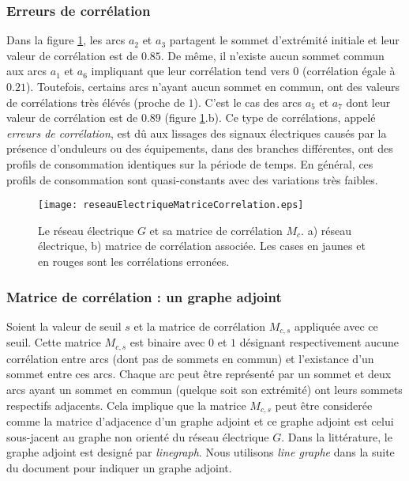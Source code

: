 \subsubsection{Erreurs de corr\'elation}
Dans la figure \ref{reseauElectriqueMatriceCorrelation}, les arcs $a_2$ et $a_3$ partagent le sommet d'extr\'emit\'e initiale et leur valeur de corr\'elation est de $0.85$.  De m\^eme, il n'existe aucun sommet commun aux arcs $a_1$ et $a_6$ impliquant que leur corr\'elation tend vers $0$ (corr\'elation \'egale \`a $0.21$). 
Toutefois, certains arcs n'ayant aucun sommet en commun, ont des valeurs de corr\'elations tr\`es \'el\'ev\'es (proche de $1$). 
C'est le cas des arcs $a_5$ et $a_7$ dont leur valeur de corr\'elation est de $0.89$ (figure \ref{reseauElectriqueMatriceCorrelation}.b).
\newline
Ce type de corr\'elations, appel\'e {\em erreurs de corr\'elation}, est d\^u aux lissages des signaux \'electriques caus\'es par la pr\'esence d'onduleurs ou des \'equipements, dans des branches diff\'erentes, ont des profils de consommation identiques sur la p\'eriode de temps. En g\'en\'eral, ces profils de consommation sont quasi-constants avec des variations tr\`es faibles.
\begin{centering}\vspace{-0.5em}
	\begin{figure}[htb!]\vspace{-0.5em}
	\texttt{[image: reseauElectriqueMatriceCorrelation.eps]}\vspace{-0.5em}
	\caption{ Le r\'eseau \'electrique $G$ et sa matrice de corr\'elation $M_c$. a) r\'eseau \'electrique, b) matrice de corr\'elation associ\'ee. Les cases en jaunes et en rouges sont les corr\'elations erron\'ees. }\vspace{-0.5em}
	\label{reseauElectriqueMatriceCorrelation}
	\end{figure}
\end{centering}

\subsubsection{Matrice de corr\'elation : un graphe adjoint}
Soient la valeur de seuil $s$ et la matrice de corr\'elation $M_{c,s}$ appliqu\'ee avec ce seuil.
Cette matrice $M_{c,s}$ est binaire avec $0$ et $1$ d\'esignant respectivement aucune corr\'elation entre arcs (dont pas de sommets en commun) et l'existance d'un sommet entre ces arcs.
\newline
Chaque arc peut \^etre repr\'esent\'e par un sommet et deux arcs ayant un sommet en commun (quelque soit son extr\'emit\'e) ont leurs sommets respectifs adjacents. 
Cela implique que la matrice $M_{c,s}$ peut \^etre consider\'ee comme la matrice d'adjacence d'un graphe adjoint et ce graphe adjoint est celui sous-jacent au graphe non orient\'e du r\'eseau \'electrique $G$. 
\newline
Dans la litt\'erature, le graphe adjoint est design\'e par {\em linegraph}. Nous utilisons {\em line graphe} dans la suite du document pour indiquer un graphe adjoint.

